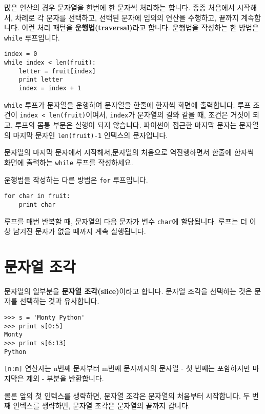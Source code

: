 많은 연산의 경우 문자열을 한번에 한 문자씩 처리하는 합니다. 종종 처음에서 시작해서, 차례로 각 문자를 선택하고,
선택된 문자에 임의의 연산을 수행하고, 끝까지 계속합니다. 이런 처리 패턴을 {\bf 운행법(traversal)}라고 합니다.
운행법을 작성하는 한 방법은 {\tt while} 루프입니다.

\beforeverb
\begin{verbatim}
index = 0
while index < len(fruit):
    letter = fruit[index]
    print letter
    index = index + 1
\end{verbatim}
\afterverb
%
{\tt while} 루프가 문자열을 운행하여 문자열을 한줄에 한자씩 화면에 출력합니다.
루프 조건이 {\tt index < len(fruit)}이여서, {\tt index}가 문자열의 길와 같을 때,
조건은 거짓이 되고, 루프의 몸통 부문은 실행이 되지 않습니다. 
파이썬이 접근한 마지막 문자는 문자열의 마지막 문자인 {\tt len(fruit)-1} 인텍스의 문자입니다.

\begin{ex}
문자열의 마지막 문자에서 시작해서,문자열의 처음으로 역진행하면서 한줄에 한자씩 화면에 출력하는 {\tt while} 루프를 작성하세요.
\end{ex}

운행법을 작성하는 다른 방법은 {\tt for} 루프입니다.

\beforeverb
\begin{verbatim}
for char in fruit:
    print char
\end{verbatim}
\afterverb
%

루프를 매번 반복할 때, 문자열의 다음 문자가 변수 {\tt char}에 할당됩니다. 루프는 더 이상 남겨진 문자가 없을 때까지 계속 실행됩니다.

\section{문자열 조각}
\label{slice}


문자열의 일부분을 {\bf 문자열 조각(slice)}이라고 합니다. 문자열 조각을 선택하는 것은 문자를 선택하는 것과 유사합니다.

\beforeverb
\begin{verbatim}
>>> s = 'Monty Python'
>>> print s[0:5]
Monty
>>> print s[6:13]
Python
\end{verbatim}
\afterverb
%
{\tt [n:m]} 연산자는 n번째 문자부터 m번째 문자까지의 문자열 - 첫 번째는 포함하지만 마지막은 제외 - 부분을 반환합니다.

콜론 앞의 첫 인텍스를 생략하면, 문자열 조각은 문자열의 처음부터 시작합니다.
두 번째 인텍스를 생략하면, 문자열 조각은 문자열의 끝까지 갑니다. 

